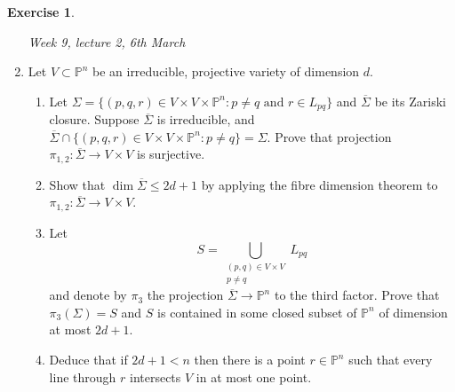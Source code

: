 \documentclass{article}
\newcommand{\p}{\mathbb{P}}
\theoremstyle{definition}
\newtheorem{exe}[defn]{Exercise}
\begin{document}
\begin{exe}
\begin{enumerate}
\begin{flushright}
\textit{Week 9, lecture 2, 6th March}
\end{flushright}

\item Let $V\subset\p^n$ be an irreducible, projective variety of dimension $d$.
\begin{enumerate}
\item Let $\Sigma=\{(p,q,r)\in V\times V\times \p^n:p\neq q\text{ and }r\in L_{pq}\}$ and $\overline\Sigma$ be its Zariski closure. Suppose $\overline\Sigma$ is irreducible, and $\overline\Sigma\cap\{(p,q,r)\in V\times V\times \p^n:p\neq q\}=\Sigma$. Prove that projection $\pi_{1,2}:\overline\Sigma\rightarrow V\times V$ is surjective.
\item Show that $\dim\overline\Sigma\leq 2d+1$ by applying the fibre dimension theorem to $\pi_{1,2}:\overline\Sigma\rightarrow V\times V$.
\item Let\[
S=\bigcup_{\substack{(p,q)\in V\times V\\ p\neq q}}L_{pq}
\]
and denote by $\pi_3$ the projection $\overline\Sigma\rightarrow\p^n$ to the third factor. Prove that $\pi_3(\Sigma)=S$ and $S$ is contained in some closed subset of $\p^n$ of dimension at most $2d+1$.
\item Deduce that if $2d+1<n$ then there is a point $r\in\p^n$ such that every line through $r$ intersects $V$ in at most one point.
\end{enumerate}


\end{enumerate}
\end{exe}
\end{document}
